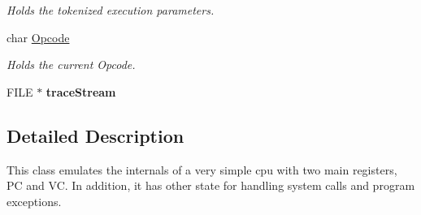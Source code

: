 \begin{DoxyCompactItemize}
\begin{DoxyCompactList}\small\item\em \-Holds the tokenized execution parameters. \end{DoxyCompactList}\item 
\hypertarget{classcCPU_a897ce4ac1712c81e8c1a7e13733be8fc}{char \hyperlink{classcCPU_a897ce4ac1712c81e8c1a7e13733be8fc}{\-Opcode}}\label{d2/dc6/classcCPU_a897ce4ac1712c81e8c1a7e13733be8fc}

\begin{DoxyCompactList}\small\item\em \-Holds the current \-Opcode. \end{DoxyCompactList}\item 
\hypertarget{classcCPU_a5f4c42c44a803d6bd2c47103c3cec164}{\-F\-I\-L\-E $\ast$ {\bfseries trace\-Stream}}\label{d2/dc6/classcCPU_a5f4c42c44a803d6bd2c47103c3cec164}

\end{DoxyCompactItemize}


\subsection{\-Detailed \-Description}
\-This class emulates the internals of a very simple cpu with two main registers, \-P\-C and \-V\-C. \-In addition, it has other state for handling system calls and program exceptions. 

